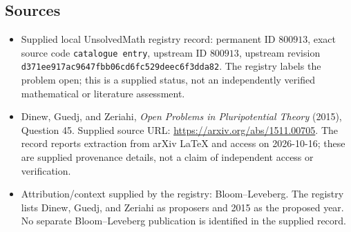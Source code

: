 \documentclass[11pt]{article}
\begin{document}
\subsection{Sources}
\begin{itemize}
\item Supplied local UnsolvedMath registry record: permanent ID \(800913\), exact source code \texttt{catalogue entry}, upstream ID \(800913\), upstream revision \texttt{d371ee917ac9647fbb06cd6fc529deec6f3dda82}. The registry labels the problem open; this is a supplied status, not an independently verified mathematical or literature assessment.
\item Dinew, Guedj, and Zeriahi, \emph{Open Problems in Pluripotential Theory} (2015), Question 45. Supplied source URL: \url{https://arxiv.org/abs/1511.00705}. The record reports extraction from arXiv LaTeX and access on 2026-10-16; these are supplied provenance details, not a claim of independent access or verification.
\item Attribution/context supplied by the registry: Bloom--Leveberg. The registry lists Dinew, Guedj, and Zeriahi as proposers and 2015 as the proposed year. No separate Bloom--Leveberg publication is identified in the supplied record.
\end{itemize}
\end{document}
